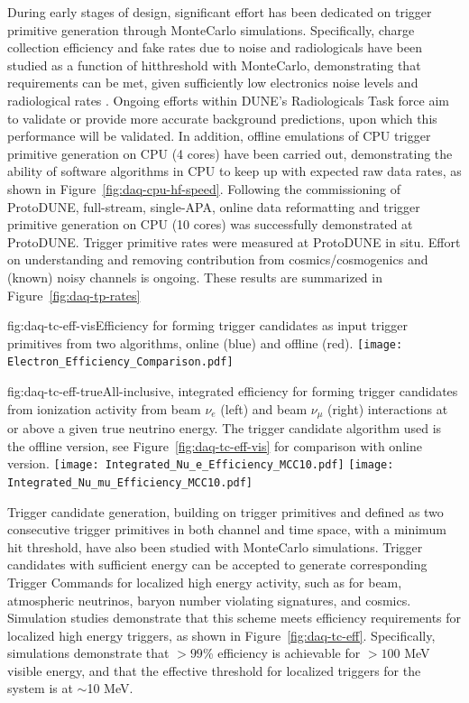 During early stages of design, significant effort has been dedicated on trigger primitive generation
through MonteCarlo simulations. Specifically, charge collection efficiency and fake rates
due to noise and radiologicals have been studied as a function of
hitthreshold with MonteCarlo, demonstrating that requirements can be
met, given sufficiently low electronics noise levels and radiological
rates \cite{ref}. Ongoing efforts within DUNE's Radiologicals Task force
aim to validate or provide more accurate background predictions, upon
which this performance will be validated. In addition, offline emulations
of CPU trigger primitive generation on CPU (4 cores) have been carried
out, demonstrating the ability of software algorithms in CPU to keep
up with expected raw data rates, as shown in Figure~\ref{fig:daq-cpu-hf-speed}. 
Following the commissioning of ProtoDUNE, full-stream, single-APA,
online data reformatting and trigger primitive generation on CPU (10 cores) was successfully
demonstrated at ProtoDUNE. Trigger primitive rates were measured at
ProtoDUNE in situ. Effort on understanding and removing contribution
from cosmics/cosmogenics and (known) noisy channels is ongoing.
These results are summarized in Figure~\ref{fig:daq-tp-rates}

\begin{dunefigure}{fig:daq-tc-eff-vis}{Efficiency for forming trigger candidates as input trigger primitives from two algorithms, online (blue) and offline (red).}
  \texttt{[image: Electron\_Efficiency\_Comparison.pdf]}
\end{dunefigure}

\begin{dunefigure}{fig:daq-tc-eff-true}{All-inclusive, integrated efficiency for forming trigger candidates from ionization activity from beam $\nu_e$ (left) and beam $\nu_\mu$ (right) interactions at or above a given true neutrino energy.  The trigger candidate algorithm used is the offline version, see Figure~\ref{fig:daq-tc-eff-vis} for comparison with online version.}
  \texttt{[image: Integrated\_Nu\_e\_Efficiency\_MCC10.pdf]}%
  \texttt{[image: Integrated\_Nu\_mu\_Efficiency\_MCC10.pdf]}
\end{dunefigure}


Trigger candidate generation, building on trigger primitives and defined
as two consecutive trigger primitives in both channel and time space,
with a minimum hit threshold, have also been studied with MonteCarlo
simulations. Trigger candidates with sufficient energy can be accepted
to generate corresponding Trigger Commands for localized high energy
activity, such as for beam, atmospheric neutrinos, baryon number
violating signatures, and cosmics. Simulation studies demonstrate that
this scheme meets efficiency requirements for localized high energy
triggers, as shown in Figure~\ref{fig:daq-tc-eff}. Specifically,
simulations demonstrate that $>99$\% efficiency is achievable for
$>100$ MeV visible energy, and that the effective threshold for
localized triggers for the system is at $\sim$10 MeV. 

